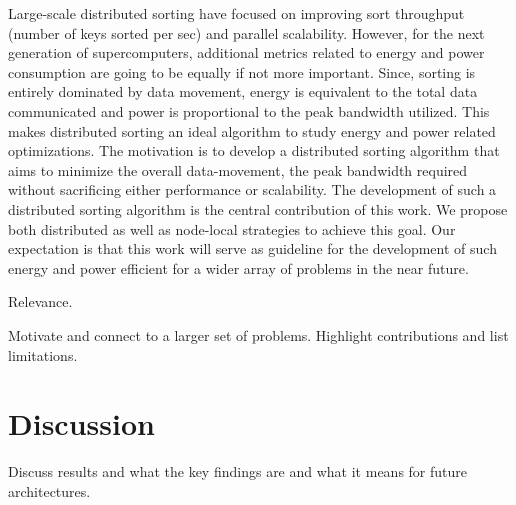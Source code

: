 \documentclass[10pt, conference, compsocconf]{IEEEtran}
\begin{document}
Large-scale distributed sorting have focused on improving sort throughput (number of keys sorted per sec) and parallel scalability. However, for the next generation of supercomputers, additional metrics related to energy and power consumption are going to be equally if not more important. Since, sorting is entirely dominated by data movement, energy is equivalent to the total data communicated and power is proportional to the peak bandwidth utilized. This makes distributed sorting an ideal algorithm to study energy and power related optimizations. The motivation is to develop a distributed sorting algorithm that aims to minimize the overall data-movement, the peak bandwidth required without sacrificing either performance or scalability. The development of such a distributed sorting algorithm is the central contribution of this work. We propose both distributed as well as node-local strategies to achieve this goal. Our expectation is that this work will serve as guideline for the development of such energy and power efficient for a wider array of problems in the near future.

Relevance. 
 
Motivate and connect to a larger set of problems. Highlight contributions and list limitations.







\section{Discussion}
Discuss results and what the key findings are and what it means for future architectures.




%

 

\end{document}

